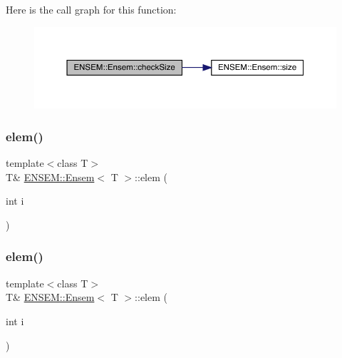 Here is the call graph for this function\+:
\nopagebreak
\begin{figure}[H]
\begin{center}
\leavevmode
\includegraphics[width=350pt]{d7/d3e/classENSEM_1_1Ensem_a4c06fadea7b637572de2347739b78004_cgraph}
\end{center}
\end{figure}
\mbox{\label{classENSEM_1_1Ensem_a4927ebde99b1f0a03cdcfe3fc88458a5}} 
\subsubsection{\texorpdfstring{elem()}{elem()}\hspace{0.1cm}{\footnotesize\ttfamily [1/4]}}
{\footnotesize\ttfamily template$<$class T$>$ \\
T\& \mbox{\hyperlink{classENSEM_1_1Ensem}{E\+N\+S\+E\+M\+::\+Ensem}}$<$ T $>$\+::elem (\begin{DoxyParamCaption}\item[{int}]{i }\end{DoxyParamCaption})\hspace{0.3cm}{\ttfamily [inline]}}

\mbox{\label{classENSEM_1_1Ensem_a4927ebde99b1f0a03cdcfe3fc88458a5}} 
\subsubsection{\texorpdfstring{elem()}{elem()}\hspace{0.1cm}{\footnotesize\ttfamily [2/4]}}
{\footnotesize\ttfamily template$<$class T$>$ \\
T\& \mbox{\hyperlink{classENSEM_1_1Ensem}{E\+N\+S\+E\+M\+::\+Ensem}}$<$ T $>$\+::elem (\begin{DoxyParamCaption}\item[{int}]{i }\end{DoxyParamCaption})\hspace{0.3cm}{\ttfamily [inline]}}

